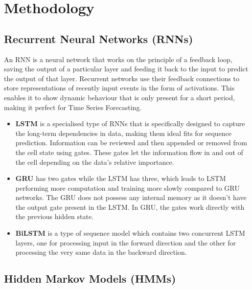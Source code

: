 \documentclass[conference]{IEEEtran}
\begin{document}
\section{Methodology}

\subsection{Recurrent Neural Networks (RNNs)}

An RNN is a neural network that works on the principle of a feedback loop, saving the output of a particular layer and feeding it back to the input to predict the output of that layer. Recurrent networks use their feedback connections to store representations of recently input events in the form of activations. This enables it to show dynamic behaviour that is only present for a short period, making it perfect for Time Series Forecasting.

\vspace{5pt} %

\begin{itemize}
    \item \textbf{LSTM} is a specialised type of RNNs that is specifically designed to capture the long-term dependencies in data, making them ideal fits for sequence prediction. Information can be reviewed and then appended or removed from the cell state using gates. These gates let the information flow in and out of the cell depending on the data's relative importance. 
\end{itemize}

\begin{itemize}
    \item \textbf{GRU} has two gates while the LSTM has three, which leads to LSTM performing more computation and training more slowly compared to GRU networks. The GRU does not possess any internal memory as it doesn’t have the output gate present in the LSTM. In GRU, the gates work directly with the previous hidden state.
\end{itemize}

\begin{itemize}
    \item \textbf{BiLSTM} is a type of sequence model which contains two concurrent LSTM layers, one for processing input in the forward direction and the other for processing the very same data in the backward direction.
\end{itemize}

\subsection{Hidden Markov Models (HMMs)}
\end{document}
